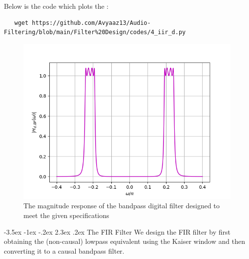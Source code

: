 \documentclass[article]{IEEEtran}
\makeatletter
\theoremstyle{remark}
\numberwithin{equation}{subsection}
\renewcommand\section{\@startsection {section}{1}{\z@}%
    {-3.5ex \@plus -1ex \@minus -.2ex}%
    {2.3ex \@plus.2ex}%
    {\normalfont\large\bfseries}}
\makeatother
\begin{document}
Below is the code which plots the :
\begin{lstlisting}
   wget https://github.com/Avyaaz13/Audio-Filtering/blob/main/Filter%20Design/codes/4_iir_d.py
\end{lstlisting}

\begin{figure}[!ht]
\centering
\includegraphics[width = \columnwidth]{figs/fig4.png}
\caption{The magnitude response of the bandpass digital filter designed to meet the given specifications} 
\label{fig4}
\end{figure}


\section{The FIR Filter}
We design the FIR filter by first obtaining the (non-causal) lowpass equivalent using the Kaiser window
and then
converting it to a causal bandpass filter.
\end{document}
